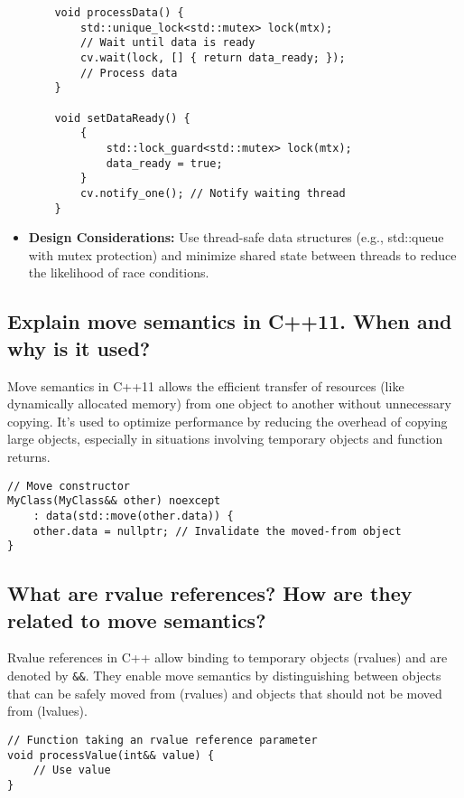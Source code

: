 \begin{itemize}
\begin{tcolorbox}[title=Thread Synchronization]
\begin{verbatim}
    void processData() {
        std::unique_lock<std::mutex> lock(mtx);
        // Wait until data is ready
        cv.wait(lock, [] { return data_ready; });
        // Process data
    }

    void setDataReady() {
        {
            std::lock_guard<std::mutex> lock(mtx);
            data_ready = true;
        }
        cv.notify_one(); // Notify waiting thread
    }
    \end{verbatim}
    \end{tcolorbox}
    \item \textbf{Design Considerations:} Use thread-safe data structures (e.g., std::queue with mutex protection) and minimize shared state between threads to reduce the likelihood of race conditions.
\end{itemize}

\subsection{Explain move semantics in C++11. When and why is it used?}
Move semantics in C++11 allows the efficient transfer of resources (like dynamically allocated memory) from one object to another without unnecessary copying. It's used to optimize performance by reducing the overhead of copying large objects, especially in situations involving temporary objects and function returns.
\begin{tcolorbox}[title=Move Semantics]
\begin{verbatim}
// Move constructor
MyClass(MyClass&& other) noexcept
    : data(std::move(other.data)) {
    other.data = nullptr; // Invalidate the moved-from object
}
\end{verbatim}
\end{tcolorbox}

\subsection{What are rvalue references? How are they related to move semantics?}
Rvalue references in C++ allow binding to temporary objects (rvalues) and are denoted by \texttt{\&\&}. They enable move semantics by distinguishing between objects that can be safely moved from (rvalues) and objects that should not be moved from (lvalues).
\begin{tcolorbox}[title=rvalue]
\begin{verbatim}
// Function taking an rvalue reference parameter
void processValue(int&& value) {
    // Use value
}
\end{verbatim}
\end{tcolorbox}

